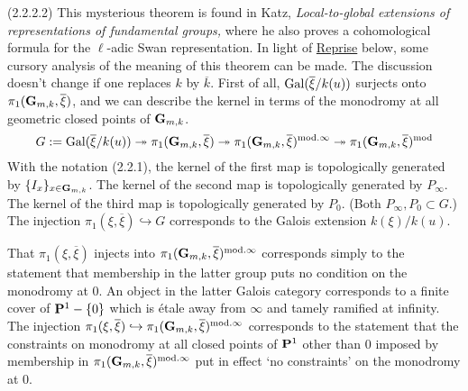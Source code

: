 \documentclass[deligne.tex]{subfiles}
\begin{document}
(2.2.2.2)\label{laumon:2.2.2.2} This mysterious theorem is found in Katz,
\emph{Local-to-global extensions of representations of fundamental groups,}
where he also proves a cohomological formula for the $\ell$-adic Swan
representation.
In light of \hyperref[laumon:reprise]{Reprise} below, some cursory analysis
of the meaning of this theorem can be made.
The discussion doesn't change if one replaces $k$ by $\overline k$.
First of all, $\operatorname{Gal}(\overline\xi/k(u))$ surjects onto
$\pi_1(\mathbf{G}_{m,k},\overline\xi)$, and we can describe the kernel in terms of
the monodromy at all geometric closed points of $\mathbf{G}_{m,k}$.
\begin{equation*}
	G:=\operatorname{Gal}(\overline\xi/k(u))
	\twoheadrightarrow\pi_1(\mathbf{G}_{m,k},\overline\xi)
	\twoheadrightarrow\pi_1(\mathbf{G}_{m,k},\overline\xi)^{\mathrm{mod}.\infty}
	\twoheadrightarrow\pi_1(\mathbf{G}_{m,k},\overline\xi)^{\mathrm{mod}}
\end{equation*}
With the notation (2.2.1),
the kernel of the first map is topologically generated by
$\{I_x\}_{x\in\mathbf{G}_{m,k}}$.
The kernel of the second map is topologically generated by $P_{\infty}$.
The kernel of the third map is topologically generated by $P_0$.
(Both $P_\infty,P_0\subset G$.)
The injection $\pi_1(\xi,\overline\xi)\hookrightarrow G$ corresponds to the
Galois extension $k(\xi)/k(u)$.

That $\pi_1(\xi,\overline\xi)$ injects into
$\pi_1(\mathbf{G}_{m,k},\overline\xi)^{\mathrm{mod}.\infty}$
corresponds simply to the statement that membership in the latter group
puts no condition on the monodromy at 0. An object in the latter Galois
category corresponds to a finite cover of $\mathbf{P}^1-\{0\}$ which is étale away
from $\infty$ and tamely ramified at infinity. The injection
$\pi_1(\xi,\overline\xi)\hookrightarrow\pi_1(\mathbf{G}_{m,k},\overline\xi)^{\mathrm{mod}.\infty}$
corresponds to the statement that the constraints on monodromy at all 
closed points of $\mathbf{P}^1$ other than 0 imposed by membership in 
$\pi_1(\mathbf{G}_{m,k},\overline\xi)^{\mathrm{mod}.\infty}$ put in effect
`no constraints' on the monodromy at 0.
\end{document}
